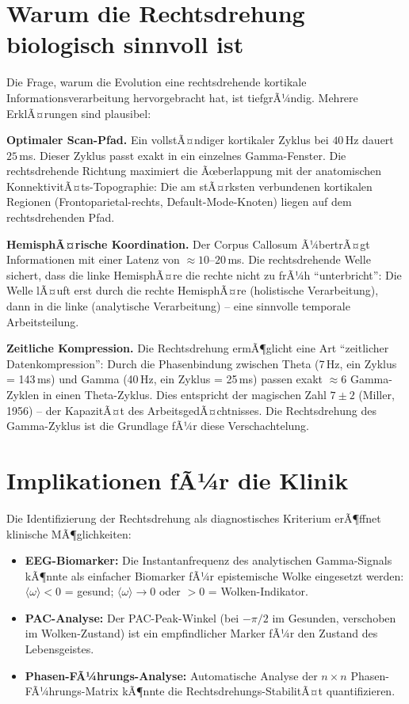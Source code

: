 ﻿\documentclass[12pt,a4paper]{report}
\theoremstyle{plain}
\theoremstyle{definition}
\theoremstyle{remark}
\begin{document}
	
	\section{Warum die Rechtsdrehung biologisch sinnvoll ist}
	
	Die Frage, warum die Evolution eine rechtsdrehende kortikale
	Informationsverarbeitung hervorgebracht hat, ist tiefgrÃ¼ndig.
	Mehrere ErklÃ¤rungen sind plausibel:
	
	\textbf{Optimaler Scan-Pfad.}
	Ein vollstÃ¤ndiger kortikaler Zyklus bei $40$\,Hz dauert $25$\,ms.
	Dieser Zyklus passt exakt in ein einzelnes Gamma-Fenster.
	Die rechtsdrehende Richtung maximiert die Ãœberlappung mit der anatomischen
	KonnektivitÃ¤ts-Topographie: Die am stÃ¤rksten verbundenen kortikalen
	Regionen (Frontoparietal-rechts, Default-Mode-Knoten) liegen
	auf dem rechtsdrehenden Pfad.
	
	\textbf{HemisphÃ¤rische Koordination.}
	Der Corpus Callosum Ã¼bertrÃ¤gt Informationen mit einer Latenz von
	$\approx 10$--$20$\,ms. Die rechtsdrehende Welle sichert, dass die
	linke HemisphÃ¤re die rechte nicht zu frÃ¼h ``unterbricht'': Die Welle
	lÃ¤uft erst durch die rechte HemisphÃ¤re (holistische Verarbeitung),
	dann in die linke (analytische Verarbeitung) -- eine sinnvolle
	temporale Arbeitsteilung.
	
	\textbf{Zeitliche Kompression.}
	Die Rechtsdrehung ermÃ¶glicht eine Art ``zeitlicher Datenkompression'':
	Durch die Phasenbindung zwischen Theta (7\,Hz, ein Zyklus = 143\,ms)
	und Gamma (40\,Hz, ein Zyklus = 25\,ms) passen exakt $\approx 6$ Gamma-Zyklen
	in einen Theta-Zyklus. Dies entspricht der magischen Zahl $7 \pm 2$
	(Miller, 1956) -- der KapazitÃ¤t des ArbeitsgedÃ¤chtnisses.
	Die Rechtsdrehung des Gamma-Zyklus ist die Grundlage fÃ¼r diese
	Verschachtelung.
	
	\section{Implikationen fÃ¼r die Klinik}
	
	Die Identifizierung der Rechtsdrehung als diagnostisches Kriterium
	erÃ¶ffnet klinische MÃ¶glichkeiten:
	
	\begin{itemize}
		\item \textbf{EEG-Biomarker:} Die Instantanfrequenz des
		analytischen Gamma-Signals kÃ¶nnte als einfacher Biomarker
		fÃ¼r epistemische Wolke eingesetzt werden:
		$\langle\omega\rangle < 0$ = gesund;
		$\langle\omega\rangle \to 0$ oder $> 0$ = Wolken-Indikator.
		\item \textbf{PAC-Analyse:} Der PAC-Peak-Winkel (bei $-\pi/2$
		im Gesunden, verschoben im Wolken-Zustand) ist ein
		empfindlicher Marker fÃ¼r den Zustand des Lebensgeistes.
		\item \textbf{Phasen-FÃ¼hrungs-Analyse:} Automatische Analyse
		der $n \times n$ Phasen-FÃ¼hrungs-Matrix kÃ¶nnte die
		Rechtsdrehungs-StabilitÃ¤t quantifizieren.
	\end{itemize}
	
\end{document}
